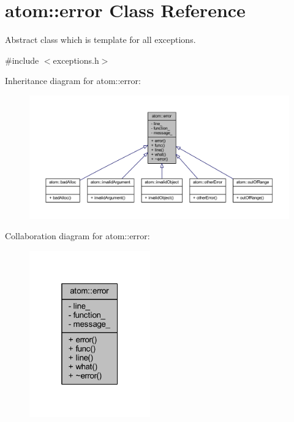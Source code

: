 \hypertarget{classatom_1_1error}{}\section{atom\+:\+:error Class Reference}
\label{classatom_1_1error}


Abstract class which is template for all exceptions.  




{\ttfamily \#include $<$exceptions.\+h$>$}



Inheritance diagram for atom\+:\+:error\+:
\nopagebreak
\begin{figure}[H]
\begin{center}
\leavevmode
\includegraphics[width=350pt]{classatom_1_1error__inherit__graph}
\end{center}
\end{figure}


Collaboration diagram for atom\+:\+:error\+:
\nopagebreak
\begin{figure}[H]
\begin{center}
\leavevmode
\includegraphics[width=148pt]{classatom_1_1error__coll__graph}
\end{center}
\end{figure}
